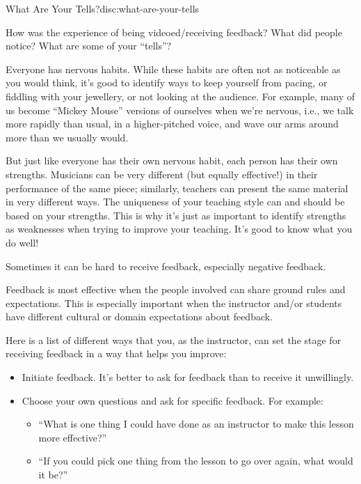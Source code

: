 
\begin{discussion}{What Are Your Tells?}{disc:what-are-your-tells}

How was the experience of being videoed/receiving feedback? What did
people notice? What are some of your ``tells''?
\end{discussion}

Everyone has nervous habits. While these habits are often not as
noticeable as you would think, it's good to identify ways to keep
yourself from pacing, or fiddling with your jewellery, or not looking at
the audience. For example, many of us become ``Mickey Mouse'' versions
of ourselves when we're nervous, i.e., we talk more rapidly than usual,
in a higher-pitched voice, and wave our arms around more than we usually
would.

But just like everyone has their own nervous habit, each person has
their own strengths. Musicians can be very different (but equally
effective!) in their performance of the same piece; similarly, teachers
can present the same material in very different ways. The uniqueness of
your teaching style can and should be based on your strengths. This is
why it's just as important to identify strengths as weaknesses when
trying to improve your teaching. It's good to know what you do well!


Sometimes it can be hard to receive feedback, especially negative
feedback.


Feedback is most effective when the people involved can share ground
rules and expectations. This is especially important when the instructor
and/or students have different cultural or domain expectations about
feedback.

Here is a list of different ways that you, as the instructor, can set
the stage for receiving feedback in a way that helps you improve:

\begin{itemize}
\item
  Initiate feedback. It's better to ask for feedback than to receive it
  unwillingly.
\item
  Choose your own questions and ask for specific feedback. For example:

  \begin{itemize}
    \item
    ``What is one thing I could have done as an instructor to make this
    lesson more effective?''
  \item
    ``If you could pick one thing from the lesson to go over again, what
    would it be?''
  \end{itemize}
\end{itemize}

